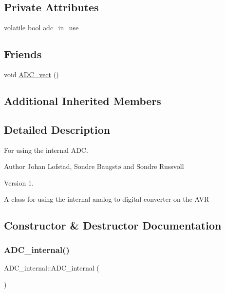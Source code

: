 \subsection*{Private Attributes}
\begin{DoxyCompactItemize}
\item 
volatile bool \hyperlink{class_a_d_c__internal_a7313da9fa620eae7be708a58d35dbe71}{adc\+\_\+in\+\_\+use}
\end{DoxyCompactItemize}
\subsection*{Friends}
\begin{DoxyCompactItemize}
\item 
void \hyperlink{class_a_d_c__internal_a7fd45f1c13cbbf59c3e1ce84deca2e01}{A\+D\+C\+\_\+vect} ()
\end{DoxyCompactItemize}
\subsection*{Additional Inherited Members}


\subsection{Detailed Description}
For using the internal A\+DC. 

\begin{DoxyAuthor}{Author}
Johan Lofstad, Sondre Baugstø and Sondre Russvoll 
\end{DoxyAuthor}
\begin{DoxyVersion}{Version}
1.
\end{DoxyVersion}
A class for using the internal analog-\/to-\/digital converter on the A\+VR 

\subsection{Constructor \& Destructor Documentation}
\hypertarget{class_a_d_c__internal_a4a34ce3ab980b7ab37672153c86d229a}{}\label{class_a_d_c__internal_a4a34ce3ab980b7ab37672153c86d229a} 
\subsubsection{\texorpdfstring{A\+D\+C\+\_\+internal()}{ADC\_internal()}\hspace{0.1cm}{\footnotesize\ttfamily [1/2]}}
{\footnotesize\ttfamily A\+D\+C\+\_\+internal\+::\+A\+D\+C\+\_\+internal (\begin{DoxyParamCaption}{ }\end{DoxyParamCaption})\hspace{0.3cm}{\ttfamily [private]}}

